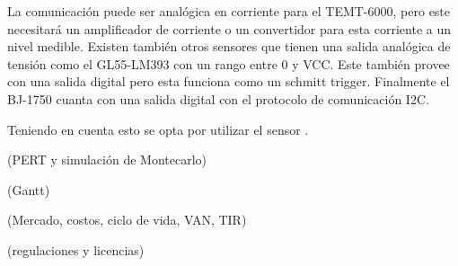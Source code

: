 La comunicación puede ser analógica en corriente para el TEMT-6000, pero este necesitará un amplificador de corriente o un convertidor para esta corriente a un nivel medible. Existen también otros sensores que tienen una salida analógica de tensión como el GL55-LM393 con un rango entre 0 y VCC. Este también provee con una salida digital pero esta funciona como un schmitt trigger. Finalmente el BJ-1750 cuanta con una salida digital con el protocolo de comunicación I2C.

Teniendo en cuenta esto se opta por utilizar el sensor \TBD. 


(PERT y simulación de Montecarlo)

(Gantt)

(Mercado, costos, ciclo de vida, VAN, TIR)

(regulaciones y licencias)



